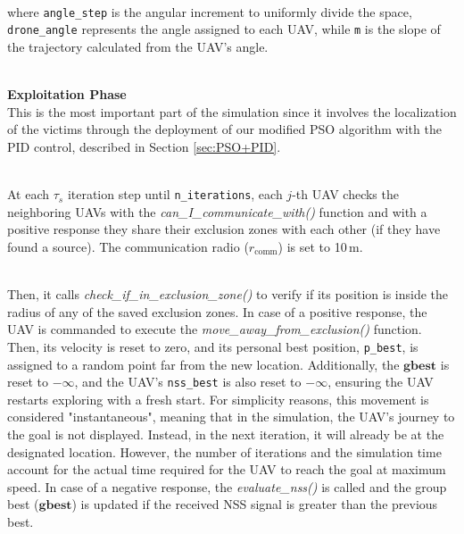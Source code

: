 \documentclass[main]{subfiles}
\begin{document}
\noindent\\
where \texttt{angle\_step} is the angular increment to uniformly divide the space,
\texttt{drone\_angle} represents the angle assigned to each UAV, 
while \texttt{m} is the slope of the trajectory calculated from the UAV's angle. 

\noindent\\
\textbf{Exploitation Phase}\noindent\\
This is the most important part of the simulation since it involves
the localization of the victims through the deployment of our modified PSO
algorithm with the PID control, described in Section \ref{sec:PSO+PID}.

\noindent\\
At each $\tau_s$ iteration step until \texttt{n\_iterations},
each $j$-th UAV checks the neighboring UAVs with the
\textit{can\_I\_communicate\_with()} function and with a 
positive response they share their exclusion zones with each other
(if they have found a source). The communication radio (\(r_{\text{comm}}\))
is set to 10\,m.

\noindent\\
Then, it calls \textit{check\_if\_in\_exclusion\_zone()}
to verify if its position is inside the radius of any of the 
saved exclusion zones.
In case of a positive response, the UAV is commanded to 
execute the \textit{move\_away\_from\_exclusion()} function. 
Then, its velocity is reset to zero, and its personal 
best position, \texttt{p\_best}, is assigned to a random point 
far from the new location. Additionally, the $\mathbf{gbest}$ 
is reset to \(-\infty\), and the 
UAV's \texttt{nss\_best} is also reset to \(-\infty\), 
ensuring the UAV restarts exploring with a fresh start.
For simplicity reasons, this movement is considered "instantaneous", 
meaning that in the simulation, the UAV's journey to the goal is 
not displayed. Instead, in the next iteration, it will already 
be at the designated location. However, the number of 
iterations and the simulation time account for the actual 
time required for the UAV to reach the goal at maximum speed.
In case of a negative response, the \textit{evaluate\_nss()} is 
called and the group best ($\mathbf{gbest}$) is updated if the received NSS signal 
is greater than the previous best.
\end{document}
